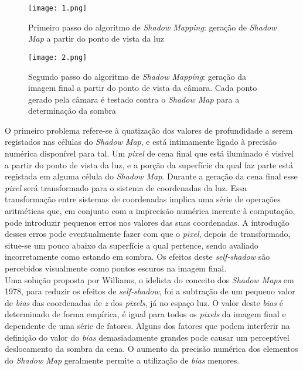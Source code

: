 \documentclass[12pt]{article}
\begin{document}
\begin{figure}[!h]
\centering
\texttt{[image: 1.png]}
\caption{Primeiro passo do algoritmo de {\it Shadow Mapping}: geração de {\it Shadow Map} a partir do ponto de vista da luz}
\label{img1}
\end{figure}

\begin{figure}[!h]
\centering
\texttt{[image: 2.png]}
\caption{Segundo passo do algoritmo de {\it Shadow Mapping}: geração da imagem final a partir do ponto de vista da câmara. Cada ponto gerado pela
câmara é testado contra o {\it Shadow Map} para a determinação da sombra}
\label{img1}
\end{figure}

O primeiro problema refere-se à quatização dos valores de profundidade a serem registados nas células do {\it Shadow Map}, e está intimamente ligado à precisão numérica disponível para tal. Um {\it pixel} de cena final que está iluminado é visível a partir do ponto de vista da luz, e a porção da superfície da qual faz parte está registada em alguma célula do {\it Shadow Map}. Durante a geração da cena final esse {\it pixel} será transformado para o sistema de coordenadas da luz. Essa transformação entre sistemas de coordenadas implica uma série de operações aritméticas que, em conjunto com a imprecisão numérica inerente à computação, pode introduzir pequenos erros nos valores das suas coordenadas. A introdução desses erros pode eventualmente fazer com que o {\it pixel}, depois de transformado, situe-se um pouco abaixo da superfície a qual pertence, sendo avaliado incorretamente como estando em sombra. Os efeitos deste {\it self-shadow} são percebidos visualmente como pontos escuros na imagem final.\\

Uma solução proposta por Williams, o idelista do conceito dos {\it Shadow Maps} em 1978, para reduzir os efeitos de {\it self-shadow}, foi a subtração de um pequeno valor de {\it bias} das coordenadas de {\it z} dos {\it pixels}, já no espaço luz. O valor deste {\it bias} é determinado de forma empírica, é igual para todos os {\it pixels} da imagem final e dependente de uma série de fatores. Alguns dos fatores que podem interferir na definição do valor do {\it bias} demasiadamente grandes pode causar um perceptível deslocamento da sombra da cena. O aumento da precisão numérica dos elementos do {\it Shadow Map} geralmente permite a utilização de {\it bias} menores.\\
\end{document}
